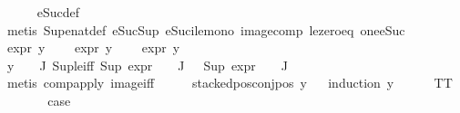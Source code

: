 \begin{isabellebody}
\ \ \ \ \isamarkupfalse%
\ eSuc{\isacharunderscore}{\kern0pt}def\isanewline
\ \ \ \ \isamarkupfalse%
\ {\isacharparenleft}{\kern0pt}metis\ Sup{\isacharunderscore}{\kern0pt}enat{\isacharunderscore}{\kern0pt}def\ eSuc{\isacharunderscore}{\kern0pt}Sup\ eSuc{\isacharunderscore}{\kern0pt}ile{\isacharunderscore}{\kern0pt}mono\ image{\isacharunderscore}{\kern0pt}comp\ le{\isacharunderscore}{\kern0pt}zero{\isacharunderscore}{\kern0pt}eq\ one{\isacharunderscore}{\kern0pt}eSuc{\isacharparenright}{\kern0pt}\isanewline
\ \ \isamarkupfalse%
\ {\isachardoublequoteopen}expr{\isacharunderscore}{\kern0pt}{}\ y\ {\isasymle}\ {}{\isachardoublequoteclose}\isanewline
\ \ {\isachardoublequoteopen}expr{\isacharunderscore}{\kern0pt}{}\ y\ {\isasymle}\ {}{\isachardoublequoteclose}\isanewline
\ \ {\isachardoublequoteopen}expr{\isacharunderscore}{\kern0pt}{}\ y\ {\isasymle}\ {}{\isachardoublequoteclose}\isanewline
\ \ \ \ \isamarkupfalse%
\ {\isacartoucheopen}y\ {\isasymin}\ {\isasymPhi}\ {\isacharbackquote}{\kern0pt}\ J{\isacartoucheclose}\ Sup{\isacharunderscore}{\kern0pt}le{\isacharunderscore}{\kern0pt}iff\ {\isacartoucheopen}Sup\ {\isacharparenleft}{\kern0pt}{\isacharparenleft}{\kern0pt}expr{\isacharunderscore}{\kern0pt}{}\ {\isasymcirc}\ {\isasymPhi}{\isacharparenright}{\kern0pt}\ {\isacharbackquote}{\kern0pt}\ J{\isacharparenright}{\kern0pt}\ {\isasymle}\ {}{\isacartoucheclose}\ {\isacartoucheopen}Sup\ {\isacharparenleft}{\kern0pt}{\isacharparenleft}{\kern0pt}expr{\isacharunderscore}{\kern0pt}{}\ {\isasymcirc}\ {\isasymPhi}{\isacharparenright}{\kern0pt}\ {\isacharbackquote}{\kern0pt}\ J{\isacharparenright}{\kern0pt}\ {\isasymle}\ {}{\isacartoucheclose}\isanewline
\ \ \ \ \isamarkupfalse%
\ {\isacharparenleft}{\kern0pt}metis\ comp{\isacharunderscore}{\kern0pt}apply\ image{\isacharunderscore}{\kern0pt}iff{\isacharparenright}{\kern0pt}{\isacharplus}{\kern0pt}\isanewline
\ \ \isamarkupfalse%
\ \isamarkupfalse%
\ {\isachardoublequoteopen}stacked{\isacharunderscore}{\kern0pt}pos{\isacharunderscore}{\kern0pt}conj{\isacharunderscore}{\kern0pt}pos\ y{\isachardoublequoteclose}\isanewline
\ \ \isamarkupfalse%
{\isacharparenleft}{\kern0pt}induction\ y{\isacharparenright}{\kern0pt}\isanewline
\ \ \ \ \isamarkupfalse%
\ TT\isanewline
\ \ \ \ \isamarkupfalse%
\ \isamarkupfalse%
\ {\isacharquery}{\kern0pt}case\isanewline

\end{isabellebody}
